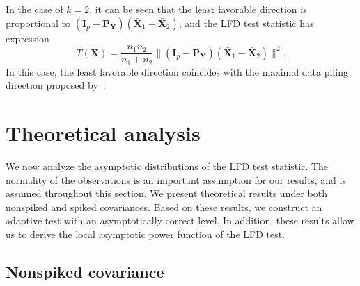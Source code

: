 \documentclass[12pt]{article} %
\newcommand{\bX}{\mathbf{X}}
\newcommand{\bP}{\mathbf{P}}
\newcommand{\bY}{\mathbf{Y}}
\newcommand{\bI}{\mathbf{I}}
\theoremstyle{definition}
\begin{document}
In the case of $k=2$, it can be seen that the least favorable direction is proportional to
$
(\bI_p-\bP_{\bY}) (\bar{\bX}_1-\bar{\bX}_2)
$, and the LFD test statistic has expression
$$
T(\bX)=\frac{n_1 n_2}{n_1+n_2}\| (\bI_p-\bP_{\bY}) (\bar{\bX}_1-\bar{\bX}_2)\|^2.
$$
In this case, 
the least favorable direction coincides with the maximal data piling direction proposed by~\cite{Ahn2010}.

\section{Theoretical analysis}\label{THEO}
\setcounter{equation}{0} %
We now analyze the asymptotic distributions of the LFD test statistic.
The normality of the observations is an important assumption for our results, and is assumed throughout this section.
We present theoretical results under both nonspiked and spiked covariances.
Based on these results, we construct an adaptive test with an asymptotically correct level.
In addition, these results allow us to derive the local asymptotic power function of the LFD test.









\subsection{Nonspiked covariance}
\end{document}

